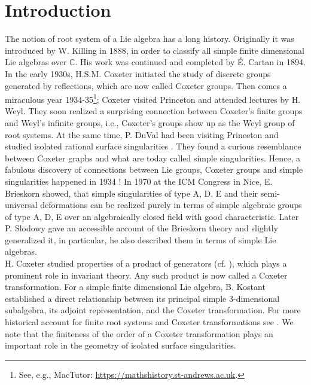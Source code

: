 \documentclass[11pt]{amsart}
\newcommand{\C}{\mathbb{C}}
\begin{document}
\section*{Introduction}

The notion of root system of a Lie algebra has a long history. Originally it was introduced by W. Killing \cite{Killing1888, Killing1889a, Killing1889b, Killing1890} in 1888, in order to classify all simple finite dimensional Lie algebras over $\C$. His work was continued and completed by \'{E}. Cartan \cite{Cartan1894} in 1894. In the early 1930s,  H.S.M. Coxeter \cite{Coxeter1934} initiated the study of discrete groups  generated by reflections, which are now called Coxeter groups. Then comes a miraculous year 1934-35\footnote{See, e.g., MacTutor: \url{https://mathshistory.st-andrews.ac.uk}.}; Coxeter visited Princeton and attended lectures by H. Weyl. They soon realized a surprising connection between Coxeter's finite groups and Weyl's infinite groups, i.e., Coxeter's groups show up as the Weyl group of root systems. At the same time, P. DuVal had been visiting Princeton and  studied isolated rational surface singularities \cite{DuVal1934-I, DuVal1934-II, DuVal1934-III}. They found a curious resemblance between Coxeter graphs and what are today called simple singularities. Hence, a fabulous discovery of connections between Lie groups, Coxeter groups and simple singularities happened in 1934 !
In 1970 at the ICM Congress in Nice, E. Brieskorn \cite{Brieskorn1971} showed,
 that simple singularities of type A, D, E and their semi-universal deformations can be realized purely in terms of simple algebraic groups of type A, D, E over an algebraically closed field with good characteristic. Later P. Slodowy \cite{Slodowy1980a, Slodowy1980b} gave an accessible account of the Brieskorn theory and slightly generalized it, in particular, he also described them in terms of simple Lie algebras. \\


H. Coxeter studied properties of a product of generators (cf. \cite{Coxeter1951}), which plays a prominent role in invariant theory. Any such product is now called a Coxeter transformation. For a simple finite dimensional Lie algebra, B. Kostant \cite{Kostant1959} established a direct relationship between its principal simple 3-dimensional subalgebra, its adjoint representation, and the Coxeter transformation. For more historical account for finite root systems and Coxeter transformations see \cite{Bourbaki(Lie)4-6}. We note that the finiteness of the order of a Coxeter transformation plays an important role in the geometry of isolated surface singularities.  \\
\end{document}
